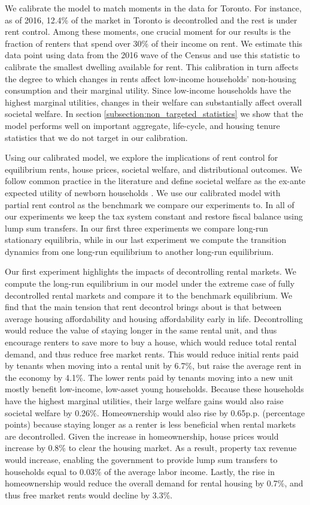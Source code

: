 \documentclass[parskip=full]{article}
\begin{document}
We calibrate the model to match moments in the data for Toronto. For instance, as of 2016,  12.4\% of the market in Toronto is decontrolled and the rest is under rent control. Among these moments, one crucial moment for our results is the fraction of renters that spend over 30\% of their income on rent. We estimate this data point using data from the 2016 wave of the Census and use this statistic to calibrate the smallest dwelling available for rent. This calibration in turn affects the degree to which changes in rents affect low-income households' non-housing consumption and their marginal utility. Since low-income households have the highest marginal utilities, changes in their welfare can substantially affect overall societal welfare. In section \ref{subsection:non_targeted_statistics} we show that the model performs well on important aggregate, life-cycle, and housing tenure statistics that we do not target in our calibration.

Using our calibrated model, we explore the implications of rent control for equilibrium rents, house prices, societal welfare, and distributional outcomes. We follow common practice in the literature and define societal welfare as the ex-ante expected utility of newborn households \citep{conesa-et-al,gkkoc}. We use our calibrated model with partial rent control as the benchmark we compare our experiments to. In all of our experiments we keep the tax system constant and restore fiscal balance using lump sum transfers. In our first three experiments we compare long-run stationary equilibria, while in our last experiment we compute the transition dynamics from one long-run equilibrium to another long-run equilibrium. 

Our first experiment highlights the impacts of decontrolling rental markets. We compute the long-run equilibrium in our model under the extreme case of fully decontrolled rental markets and compare it to the benchmark equilibrium. We find that the main tension that rent decontrol brings about is that between average housing affordability and housing affordability early in life. Decontrolling would reduce the value of staying longer in the same rental unit, and thus encourage renters to save more to buy a house, which would reduce total rental demand, and thus reduce free market rents. This would reduce initial rents paid by tenants when moving into a rental unit by 6.7\%, but raise the average rent in the economy by 4.1\%. The lower rents paid by tenants moving into a new unit mostly benefit low-income, low-asset young households. Because these households have the highest marginal utilities, their large welfare gains would also raise societal welfare by 0.26\%. Homeownership would also rise by 0.65p.p. (percentage points) because staying longer as a renter is less beneficial when rental markets are decontrolled. Given the increase in homeownership, house prices would increase by 0.8\% to clear the housing market. As a result, property tax revenue would increase, enabling the government to provide lump sum transfers to households equal to 0.03\% of the average labor income. Lastly, the rise in homeownership would reduce the overall demand for rental housing by 0.7\%, and thus free market rents would decline by 3.3\%. 
\end{document}
